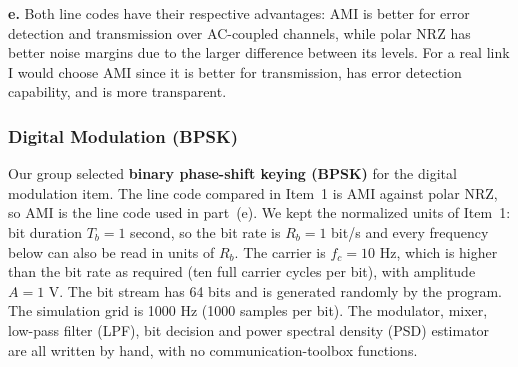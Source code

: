 \documentclass[a4paper]{article}
\begin{document}
\noindent\textbf{e.} Both line codes have their respective advantages: AMI is better for error detection and transmission over AC-coupled channels, while polar NRZ has better noise margins due to the larger difference between its levels. For a real link I would choose AMI since it is better for transmission, has error detection capability, and is more transparent.


\subsubsection{Digital Modulation (BPSK)}
Our group selected \textbf{binary phase-shift keying (BPSK)} for the digital modulation item. The line code compared in Item~1 is AMI against polar NRZ, so AMI is the line code used in part~(e). We kept the normalized units of Item~1: bit duration $T_b = 1$ second, so the bit rate is $R_b = 1$ bit/s and every frequency below can also be read in units of $R_b$. The carrier is $f_c = 10$ Hz, which is higher than the bit rate as required (ten full carrier cycles per bit), with amplitude $A = 1$ V. The bit stream has 64 bits and is generated randomly by the program. The simulation grid is 1000 Hz (1000 samples per bit). The modulator, mixer, low-pass filter (LPF), bit decision and power spectral density (PSD) estimator are all written by hand, with no communication-toolbox functions.
\end{document}
